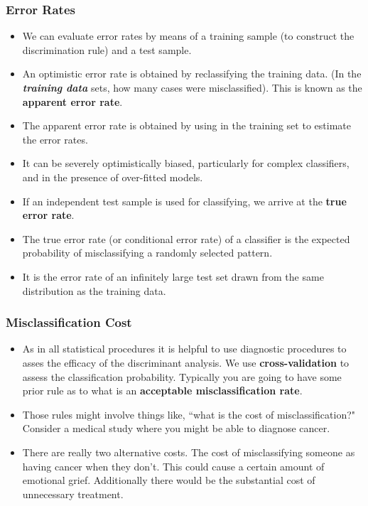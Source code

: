 \documentclass[PredictiveAnalytics101.tex]{subfiles}
\begin{document}
 



\begin{frame}
\frametitle{Error Rates}
\begin{itemize}
\item We can evaluate error rates by means of a training sample (to construct the discrimination rule) and a test sample.


\item An optimistic error rate is obtained by reclassifying the training data. (In the \textbf{\textit{training data}} sets, how many cases were misclassified). This is known as the \textbf{apparent error rate}.


\item The apparent error rate is obtained by using in the training set to estimate
the error rates.
\item It can be severely optimistically biased, particularly for complex classifiers, and in the presence of over-fitted models.
\end{itemize}

\end{frame}
\begin{frame}
\begin{itemize}
\item If an independent test sample is used for classifying, we arrive at the  \textbf{true error rate}.
\item The true error rate (or conditional error rate) of a classifier is the expected
probability of misclassifying a randomly selected pattern.
\item It is the error rate of an infinitely large test set drawn from the same distribution as the training data.
\end{itemize}


\end{frame}
\begin{frame}
\frametitle{Misclassification Cost}
\begin{itemize}
\item As in all statistical procedures it is helpful to use diagnostic procedures to asses the efficacy of the discriminant analysis. We use \textbf{cross-validation} to assess the classification probability.
Typically you are going to have some prior rule as to what is an \textbf{acceptable misclassification rate}.

\item Those rules might involve things like, ``what is the cost of misclassification?" Consider a medical study where you might be able to diagnose cancer.

\item There are really two alternative costs. The cost of misclassifying someone as having cancer when they don't.
This could cause a certain amount of emotional grief. Additionally there would be the substantial cost of unnecessary treatment.
\end{itemize}


\end{frame}
\end{document}

